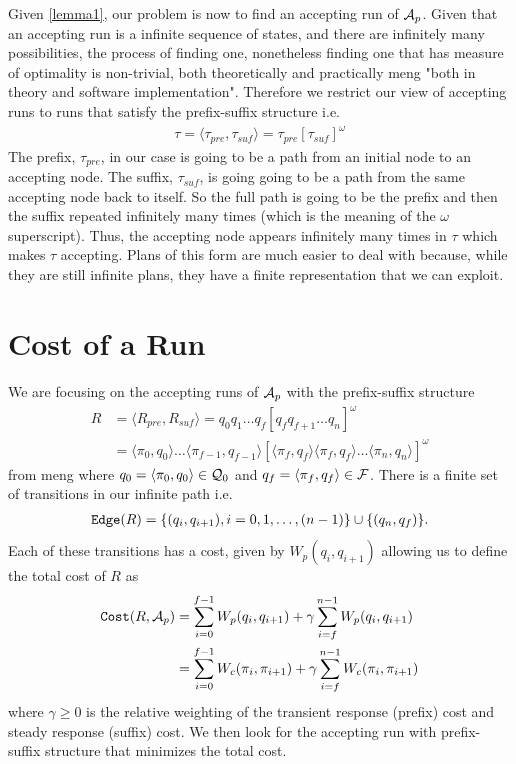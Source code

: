 Given \ref{lemma1}, our problem is now to find an accepting run of $\mathcal{A}_p$. Given that an accepting run is a infinite sequence of states, and there are infinitely many possibilities, the process of finding one, nonetheless finding one that has measure of optimality is non-trivial, both theoretically and practically meng "both in theory and software implementation". Therefore we restrict our view of accepting runs to runs that satisfy the prefix-suffix structure i.e.\
\begin{align*}
\tau = \langle \tau_{pre}, \tau_{suf} \rangle = \tau_{pre} [\tau_{suf}]^\omega
\end{align*}
The prefix, $\tau_{pre}$, in our case is going to be a path from an initial node to an accepting node. The suffix, $\tau_{suf}$, is going going to be a path from the same accepting node back to itself. So the full path is going to be the prefix and then the suffix repeated infinitely many times (which is the meaning of the $\omega$ superscript). Thus, the accepting node appears infinitely many times in $\tau$ which makes $\tau$ accepting. Plans of this form are much easier to deal with because, while they are still infinite plans, they have a finite representation that we can exploit.

\section{Cost of a Run}
We are focusing on the accepting runs of $\mathcal{A}_p$ with the prefix-suffix structure
\begin{align*}
R &= \langle R_{pre}, R_{suf} \rangle = q_0 q_1 \dots q_f [q_f q_{f+1} \dots q_n]^\omega \\
&= \langle \pi_0, q_0 \rangle \dots \langle \pi_{f-1}, q_{f-1} \rangle [ \langle \pi_f , q_f \rangle \langle \pi_f , q_f \rangle \dots \langle \pi_{n}, q_n \rangle ]^\omega
\end{align*} 
from meng
where $q_0 = \langle \pi_0, q_0 \rangle \in \mathcal{Q}_0$ and $q_f = \langle \pi_f , q_f \rangle \in \mathcal{F}$. There is a finite set of transitions in our infinite path i.e.\ 
\begin{align*}
\texttt{Edge} (R) = \{(q_i, q_{i+1}) , i = 0,1,\dots ,(n-1)\} \cup \{(q_n , q_f ) \}.
\end{align*}
Each of these transitions has a cost, given by $W_p(q_i,q_{i+1})$ allowing us to define the total cost of $R$ as
\begin{align*}
\texttt{Cost} (R, \mathcal{A}_p) &= \sum_{i=0}^{f-1} W_p(q_i,q_{i+1}) + \gamma \sum_{i=f}^{n-1} W_p(q_i,q_{i+1}) \\
&= \sum_{i=0}^{f-1} W_c(\pi_i,\pi_{i+1}) + \gamma \sum_{i=f}^{n-1} W_c(\pi_i, \pi_{i+1})
\end{align*}
where $\gamma \geq 0$ is the relative weighting of the transient response (prefix) cost and steady response (suffix) cost. We then look for the accepting run with prefix-suffix structure that minimizes the total cost. 

